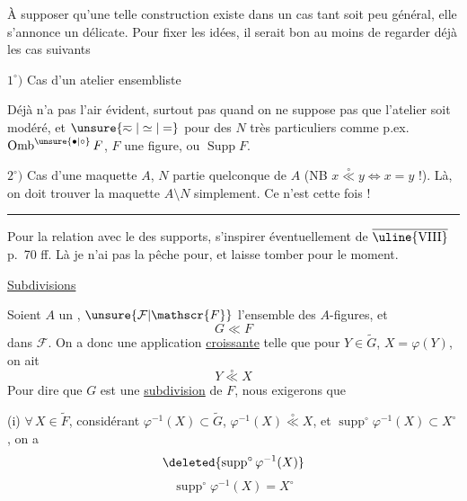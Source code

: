 
À supposer qu'une telle construction existe dans un cas tant soit peu général, elle s'annonce un  délicate. Pour fixer les idées, il serait bon  au moins de regarder déjà les cas suivants

$1^\circ)$ Cas d'un atelier ensembliste

 Déjà  n'a pas l'air évident, surtout pas quand on ne suppose pas que l'atelier soit modéré, et $\unsure{\eqsim|\simeq|=}$ pour des $N$ très particuliers comme p.ex. $\operatorname{Omb}^{\unsure{\bullet|\circ}}F$, $F$ une figure, ou $\operatorname{Supp}F$.

$2^\circ)$ Cas d'une maquette $A$, $N$ partie quelconque de $A$ (NB $x\overset{\circ}{\ll}y\Leftrightarrow x=y$ !). Là, on doit trouver la maquette $A\setminus N$ simplement. Ce n'est   cette fois !

\par\noindent\hspace*{0.3\linewidth}\rule{0.25\linewidth}{0.4pt}\par

Pour la relation avec le  des supports, s'inspirer éventuellement de  $\overline{\text{\uline{VIII}}}$ p.~70 ff. Là je n'ai pas la pêche pour, et laisse tomber pour le moment.


\uline{Subdivisions}

Soient $A$ un  , $\unsure{\mathcal{F}|\mathscr{F}}$ l'ensemble des $A$-figures, et
\[
G\ll F
\]
dans $\mathcal{F}$. On a donc une application \uline{croissante}
telle que pour $Y\in\widetilde{G}$, $X=\varphi(Y)$, on ait
\[
Y\overset{\circ}{\ll}X
\]
Pour dire que $G$ est une  \uline{subdivision} de $F$, nous exigerons  que

(i) $\forall\,X\in\widetilde{F}$,  considérant $\varphi^{-1}(X)\subset\widetilde{G}$,
$\varphi^{-1}(X)\overset{\circ}{\ll}X$, et $\operatorname{supp}^{\circ}\varphi^{-1}(X)\subset X^{\circ}$, on a
\[
\deleted{\operatorname{supp}^{\circ}\varphi^{-1}(X)}
\]
\[
\operatorname{supp}^{\circ}\varphi^{-1}(X)=X^{\circ}
\]

